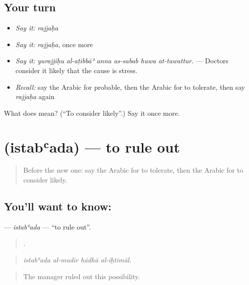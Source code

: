 \subsection*{Your turn}
\begin{itemize}
\raggedright
  \item \emph{Say it:} \emph{rajjaḥa}
  \item \emph{Say it:} \emph{rajjaḥa}, once more
  \item \emph{Say it:} \emph{yurajjiḥu al-aṭibbāʾ anna as-sabab huwa at-tawattur.} — Doctors consider it likely that the cause is stress.
  \item \emph{Recall:} say the Arabic for probable, then the Arabic for to tolerate, then say \emph{rajjaḥa} again
\end{itemize}

\begin{tcolorbox}[breakable,colback=teal!4,colframe=teal!35!black,title={Before you move on}]
What does  mean? (\textquotedblleft{}To consider likely\textquotedblright{}.) Say it once more.
\end{tcolorbox}
\section[\texorpdfstring{\ar{استبعد} (istabʿada)}{استبعد (istabʿada)}]{ (istabʿada) — to rule out}

\label{lesson:AR-C401-istabada}



\begin{quote}
Before the new one: say the Arabic for to tolerate, then the Arabic for to consider likely.
\end{quote}

\subsection*{You'll want to know: }
\textbf{} — \emph{istabʿada} — \textquotedblleft{}to rule out\textquotedblright{}.

\begin{quote}
   .
\end{quote}

\begin{quote}
\emph{istabʿada al-mudīr hādhā al-iḥtimāl.}
\end{quote}

\begin{quote}
The manager ruled out this possibility.
\end{quote}

